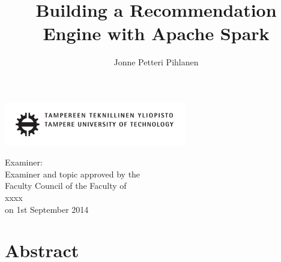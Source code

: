 \documentclass[12pt,a4paper,english
]{tutthesis}
\author{Jonne Petteri Pihlanen}
\title{Building a Recommendation Engine with Apache Spark}      %
\begin{document}
%
\thispagestyle{empty}
\vspace*{-1cm}\noindent
\includegraphics[width=8cm]{tty_tut_logo}   %

\vspace{6.8cm}
\maketitle
\vspace{7cm} %

\begin{flushright}  
  \begin{minipage}[c]{6.8cm}
    \begin{spacing}{1.0}
      \textsf{Examiner: \@examiner}\\
      \textsf{Examiner and topic approved by the}\\ 
      \textsf{Faculty Council of the Faculty of}\\
      \textsf{xxxx}\\
      \textsf{on 1st September 2014}\\
    \end{spacing}
  \end{minipage}
\end{flushright}

\if@twoside
\clearpage
\fi

%
\setcounter{page}{0} %



\chapter*{Abstract}
\end{document}
